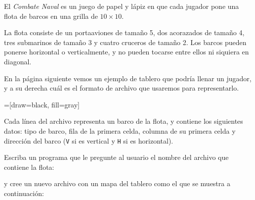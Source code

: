 
% 

\lstset{language=file,frame=single}

El \emph{Combate Naval} es un juego de papel y lápiz
en que cada jugador pone una flota de barcos
en una grilla de \(10\times 10\).

La flota consiste de
un portaaviones de tamaño 5,
dos acorazados de tamaño 4,
tres submarinos de tamaño 3
y cuatro cruceros de tamaño 2.
Los barcos pueden ponerse horizontal o verticalmente,
y no pueden tocarse entre ellos ni siquiera en dia\-gonal.

En la página siguiente vemos un ejemplo de tablero que podría llenar un jugador,
y a su derecha cuál es el formato de archivo que usaremos para representarlo.

\newpage

=[draw=black, fill=gray]
\begin{minipage}[T]{0.5\textwidth}
\end{minipage}
\begin{minipage}[T]{0.45\textwidth}
  \vspace{3ex}
  
\end{minipage}

Cada línea del archivo representa un barco de la flota,
y contiene los siguientes datos:
tipo de barco,
fila de la primera celda,
columna de su primera celda
y dirección del barco (\verb+V+ si es vertical y \verb+H+ si es horizontal).

\newpage

Escriba un programa %
que le pregunte al usuario
el nombre del archivo que contiene la flota:



y cree un nuevo archivo con un mapa del tablero
como el que se muestra a continuación:

\begin{minipage}[t]{0.45\textwidth}
  
\end{minipage}
